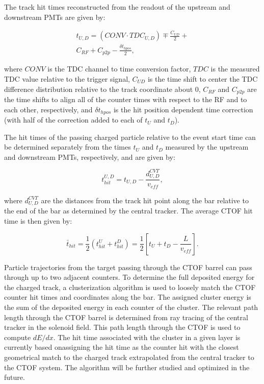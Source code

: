 \documentclass[3p,times,twocolumn]{elsarticle}
\begin{document}
The track hit times reconstructed from the readout of the upstream and downstream PMTs are given by:

\begin{multline}
  t_{U,D} = (CONV \cdot TDC_{U,D}) \mp \frac{C_{UD}}{2} + \\ C_{RF} + C_{p2p} - \frac{\delta t_{hpos}}{2},
\end{multline}

\noindent
where $CONV$ is the TDC channel to time conversion factor, $TDC$ is the measured TDC value relative
to the trigger signal, $C_{UD}$ is the time shift to center the TDC difference distribution relative to the
track coordinate about 0, $C_{RF}$ and $C_{p2p}$ are the time shifts to align all of the counter times
with respect to the RF and to each other, respectively, and $\delta t_{hpos}$ is the hit position dependent
time correction (with half of the correction added to each of $t_U$ and $t_D$).

The hit times of the passing charged particle relative to the event start time can be determined separately 
from the times $t_U$ and $t_D$ measured by the upstream and downstream PMTs, respectively, and are
given by:

\begin{equation}
t_{hit}^{U,D} = t_{U,D} - \frac{d^{CVT}_{U,D}}{v_{eff}},
\end{equation}

\noindent
where $d^{CVT}_{U,D}$ are the distances from the track hit point along the bar relative to the end of the
bar as determined by the central tracker. The average CTOF hit time is then given by:

\begin{equation}
\bar{t}_{hit} = \frac{1}{2} ( t_{hit}^U + t_{hit}^D ) = \frac{1}{2} \left[ t_U + t_D - \frac{L}{v_{eff}} \right].
\end{equation}

Particle trajectories from the target passing through the CTOF barrel can pass through up to two adjacent
counters. To determine the full deposited energy for the charged track, a clusterization algorithm is used
to loosely match the CTOF counter hit times and coordinates along the bar. The assigned cluster energy is
the sum of the deposited energy in each counter of the cluster. The relevant path length through the CTOF
barrel is determined from ray tracing of the central tracker in the solenoid field. This path length through
the CTOF is used to compute $dE/dx$. The hit time associated with the cluster in a given layer is currently
based onassigning the hit time as the counter hit with the closest geometrical match to the charged track
extrapolated from the central tracker to the CTOF system. The algorithm will be further studied and
optimized in the future.
  
\end{document}
